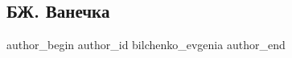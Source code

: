  
 
 
 
 
 
\subsection{БЖ. Ванечка}
\label{sec:29_06_2021.fb.bilchenko_evgenia.5.vanechka}
\ifcmt
 author_begin
   author_id bilchenko_evgenia
 author_end
\fi

